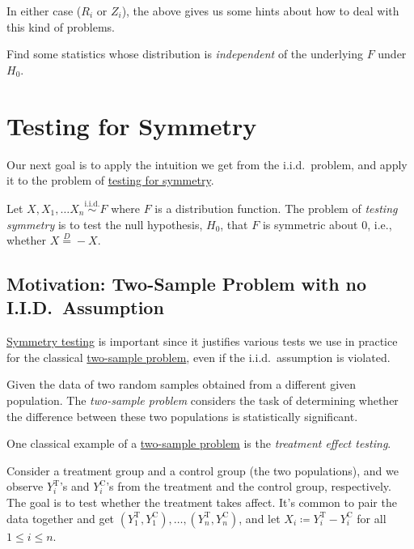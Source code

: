 In either case (\(R_i\) or \(Z_i\)), the above gives us some hints about how to deal with this kind of problems.

\begin{intuition}
	Find some statistics whose distribution is \emph{independent} of the underlying \(F\) under \(H_0\).
\end{intuition}

\section{Testing for Symmetry}
Our next goal is to apply the intuition we get from the i.i.d.\ problem, and apply it to the problem of \hyperref[prb:testing-symmetry]{testing for symmetry}.

\begin{problem}\label{prb:testing-symmetry}
Let \(X, X_1, \dots  X_n \overset{\text{i.i.d.} }{\sim } F\) where \(F\) is a distribution function. The problem of \emph{testing symmetry} is to test the null hypothesis, \(H_0\), that \(F\) is symmetric about \(0\), i.e., whether \(X \overset{D}{=} -X\).
\end{problem}

\subsection{Motivation: Two-Sample Problem with no I.I.D.\ Assumption}
\hyperref[prb:testing-symmetry]{Symmetry testing} is important since it justifies various tests we use in practice for the classical \hyperref[prb:two-sample]{two-sample problem}, even if the i.i.d.\ assumption is violated.

\begin{problem}\label{prb:two-sample}
Given the data of two random samples obtained from a different given population. The \emph{two-sample problem} considers the task of determining whether the difference between these two populations is statistically significant.
\end{problem}

One classical example of a \hyperref[prb:two-sample]{two-sample problem} is the \emph{treatment effect testing}.

\begin{eg}\label{eg:treatment-effect}
	Consider a treatment group and a control group (the two populations), and we observe \(Y_i^{\text{T} }\)'s and \(Y_i^{\text{C} }\)'s from the treatment and the control group, respectively. The goal is to test whether the treatment takes affect. It's common to pair the data together and get \((Y_1^{\text{T} }, Y_1^{\text{C} }), \dots , (Y_n^{\text{T} }, Y_n^{\text{C} })\), and let \(X_i \coloneqq Y_i^{\text{T} } - Y_i^{\text{C} }\) for all \(1 \leq i \leq n\).
\end{eg}

